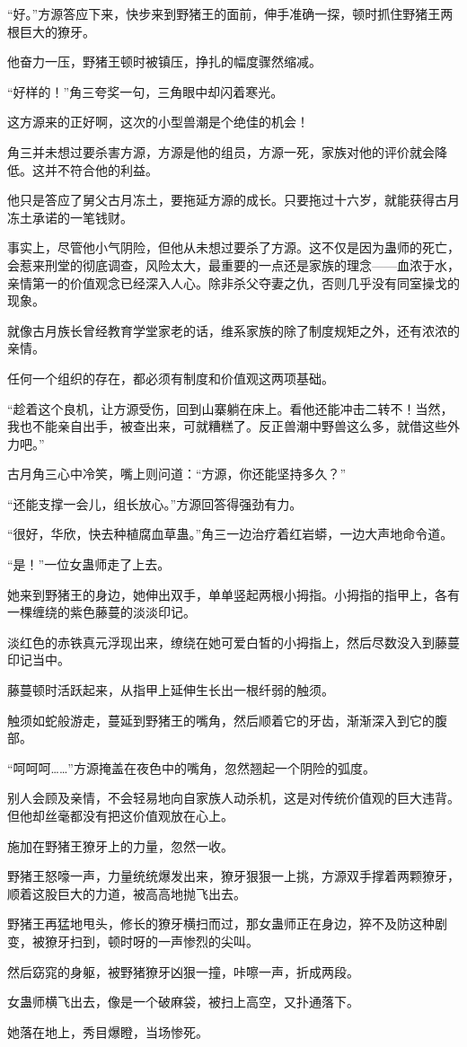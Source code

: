 \begin{this_body}
“好。”方源答应下来，快步来到野猪王的面前，伸手准确一探，顿时抓住野猪王两根巨大的獠牙。

他奋力一压，野猪王顿时被镇压，挣扎的幅度骤然缩减。

“好样的！”角三夸奖一句，三角眼中却闪着寒光。

这方源来的正好啊，这次的小型兽潮是个绝佳的机会！

角三并未想过要杀害方源，方源是他的组员，方源一死，家族对他的评价就会降低。这并不符合他的利益。

他只是答应了舅父古月冻土，要拖延方源的成长。只要拖过十六岁，就能获得古月冻土承诺的一笔钱财。

事实上，尽管他小气阴险，但他从未想过要杀了方源。这不仅是因为蛊师的死亡，会惹来刑堂的彻底调查，风险太大，最重要的一点还是家族的理念——血浓于水，亲情第一的价值观念已经深入人心。除非杀父夺妻之仇，否则几乎没有同室操戈的现象。

就像古月族长曾经教育学堂家老的话，维系家族的除了制度规矩之外，还有浓浓的亲情。

任何一个组织的存在，都必须有制度和价值观这两项基础。

“趁着这个良机，让方源受伤，回到山寨躺在床上。看他还能冲击二转不！当然，我也不能亲自出手，被查出来，可就糟糕了。反正兽潮中野兽这么多，就借这些外力吧。”

古月角三心中冷笑，嘴上则问道：“方源，你还能坚持多久？”

“还能支撑一会儿，组长放心。”方源回答得强劲有力。

“很好，华欣，快去种植腐血草蛊。”角三一边治疗着红岩蟒，一边大声地命令道。

“是！”一位女蛊师走了上去。

她来到野猪王的身边，她伸出双手，单单竖起两根小拇指。小拇指的指甲上，各有一棵缠绕的紫色藤蔓的淡淡印记。

淡红色的赤铁真元浮现出来，缭绕在她可爱白皙的小拇指上，然后尽数没入到藤蔓印记当中。

藤蔓顿时活跃起来，从指甲上延伸生长出一根纤弱的触须。

触须如蛇般游走，蔓延到野猪王的嘴角，然后顺着它的牙齿，渐渐深入到它的腹部。

“呵呵呵……”方源掩盖在夜色中的嘴角，忽然翘起一个阴险的弧度。

别人会顾及亲情，不会轻易地向自家族人动杀机，这是对传统价值观的巨大违背。但他却丝毫都没有把这价值观放在心上。

施加在野猪王獠牙上的力量，忽然一收。

野猪王怒嚎一声，力量统统爆发出来，獠牙狠狠一上挑，方源双手撑着两颗獠牙，顺着这股巨大的力道，被高高地抛飞出去。

野猪王再猛地甩头，修长的獠牙横扫而过，那女蛊师正在身边，猝不及防这种剧变，被獠牙扫到，顿时呀的一声惨烈的尖叫。

然后窈窕的身躯，被野猪獠牙凶狠一撞，咔嚓一声，折成两段。

女蛊师横飞出去，像是一个破麻袋，被扫上高空，又扑通落下。

她落在地上，秀目爆瞪，当场惨死。

\end{this_body}

